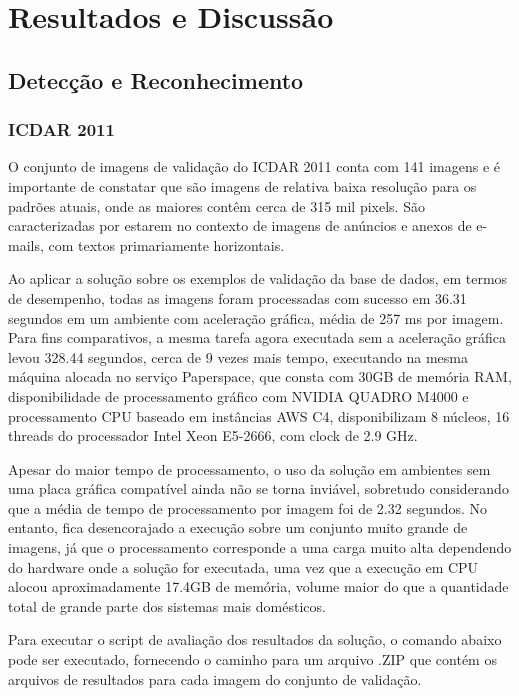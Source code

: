 \chapter{Resultados e Discussão}\label{cap:resultados}

\section{Detecção e Reconhecimento}
\subsection{ICDAR 2011}\label{sec:results_icdar_2011}
O conjunto de imagens de validação do ICDAR 2011 conta com 141 imagens e é importante de constatar que são imagens de relativa baixa resolução para os padrões atuais, onde as maiores contêm cerca de 315 mil pixels. São caracterizadas por estarem no contexto de imagens de anúncios e anexos de e-mails, com textos primariamente horizontais.

Ao aplicar a solução sobre os exemplos de validação da base de dados, em termos de desempenho, todas as imagens foram processadas com sucesso em 36.31 segundos em um ambiente com aceleração gráfica, média de 257 ms por imagem. Para fins comparativos, a mesma tarefa agora executada sem a aceleração gráfica levou 328.44 segundos, cerca de 9 vezes mais tempo, executando na mesma máquina alocada no serviço Paperspace, que consta com 30GB de memória RAM, disponibilidade de processamento gráfico com NVIDIA QUADRO M4000 e processamento CPU baseado em instâncias AWS C4, disponibilizam 8 núcleos, 16 threads do processador Intel Xeon E5-2666, com clock de 2.9 GHz.

Apesar do maior tempo de processamento, o uso da solução em ambientes sem uma placa gráfica compatível ainda não se torna inviável, sobretudo considerando que a média de tempo de processamento por imagem foi de 2.32 segundos. No entanto, fica desencorajado a execução sobre um conjunto muito grande de imagens, já que o processamento corresponde a uma carga muito alta dependendo do hardware onde a solução for executada, uma vez que a execução em CPU alocou aproximadamente 17.4GB de memória, volume maior do que a quantidade total de grande parte dos sistemas mais domésticos.

Para executar o script de avaliação dos resultados da solução, o comando abaixo pode ser executado, fornecendo o caminho para um arquivo .ZIP que contém os arquivos de resultados para cada imagem do conjunto de validação.

